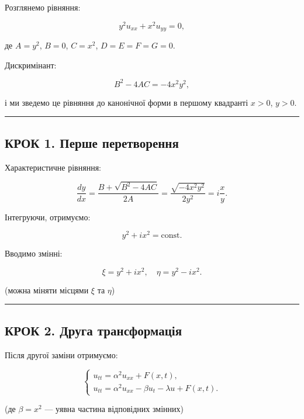 \documentclass[
  ukrainian,
]{article}
\begin{document}
Розглянемо рівняння:

\[
y^2 u_{xx} + x^2 u_{yy} = 0,
\]

де \(A = y^2\), \(B = 0\), \(C = x^2\), \(D = E = F = G = 0\).

Дискримінант:

\[
B^2 - 4AC = -4x^2 y^2,
\]

і ми зведемо це рівняння до канонічної форми в першому квадранті
\(x > 0\), \(y > 0\).

\begin{center}\rule{0.5\linewidth}{0.5pt}\end{center}

\subsection{КРОК 1. Перше
перетворення}\label{ux43aux440ux43eux43a-1.-ux43fux435ux440ux448ux435-ux43fux435ux440ux435ux442ux432ux43eux440ux435ux43dux43dux44f}

Характеристичне рівняння:

\[
\frac{dy}{dx} = \frac{B + \sqrt{B^2 - 4AC}}{2A} = \frac{\sqrt{-4x^2 y^2}}{2y^2} = i \frac{x}{y}.
\]

Інтегруючи, отримуємо:

\[
y^2 + i x^2 = \text{const}.
\]

Вводимо змінні:

\[
\xi = y^2 + i x^2, \quad \eta = y^2 - i x^2.
\]

(можна міняти місцями \(\xi\) та \(\eta\))

\begin{center}\rule{0.5\linewidth}{0.5pt}\end{center}

\subsection{КРОК 2. Друга
трансформація}\label{ux43aux440ux43eux43a-2.-ux434ux440ux443ux433ux430-ux442ux440ux430ux43dux441ux444ux43eux440ux43cux430ux446ux456ux44f}

Після другої заміни отримуємо:

\[
\begin{cases}
u_{tt} = \alpha^2 u_{xx} + F(x,t), \\
u_{tt} = \alpha^2 u_{xx} - \beta u_t - \lambda u + F(x,t).
\end{cases}
\]

(де \(\beta = x^2\) --- уявна частина відповідних змінних)
\end{document}
